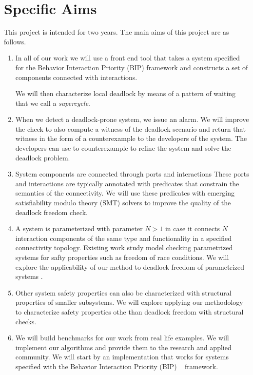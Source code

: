 \section{Specific Aims}
\label{sec:aims}

This project is intended for two years.
The main aims of this project are as follows.

\begin{enumerate}

\item 
In all of our work we will use a front end tool that
takes a system specified for the Behavior Interaction Priority (BIP)
framework and constructs a set of components connected 
with interactions. 



 We will then characterize local deadlock by
means of a pattern of waiting that we call a \emph{supercycle}.


\item 
When we detect a deadlock-prone system, we issue an alarm. 
We will improve the check to also compute a witness of the deadlock scenario 
and return that witness in the form of a counterexample 
to the developers of the system. 
The developers can use to counterexample to refine the system and solve
the deadlock problem. 

\item 
System components are connected through ports and interactions
These ports and interactions are typically annotated with predicates
that constrain the semantics of the connectivity. 
We will use these predicates with emerging satisfiability modulo theory (SMT) 
solvers to improve the quality of the deadlock freedom check.

		
\item 
A system is parameterized with parameter $N>1$ 
in case it connects $N$ interaction components of the 
same type and functionality in a specified connectivity topology. 
Existing work study model checking parametrized systems for safty properties
such as freedom of race conditions. 
We will explore the applicability of our method to deadlock freedom 
of parametrized systems
		. 

\item
Other system safety properties can also be characterized with structural 
properties of smaller subsystems. 
We will explore applying our methodology to characterize safety properties 
othe than deadlock freedom with structural checks. 

\item 
We will build benchmarks for our work from real life examples.
We will implement our algorithms and provide them to the research and 
applied community. 
We will start by an implementation that works for systems specified with 
the Behavior Interaction Priority (BIP) ~\cite{bip06} framework.

\end{enumerate}


